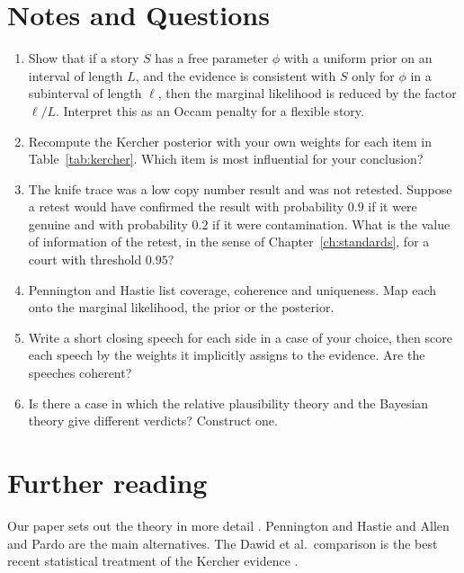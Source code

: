 \section*{Notes and Questions}
\begin{enumerate}[label=\arabic*.]
\item Show that if a story $S$ has a free parameter $\phi$ with a uniform prior on an interval of length $L$, and the evidence is consistent with $S$ only for $\phi$ in a subinterval of length $\ell$, then the marginal likelihood is reduced by the factor $\ell/L$. Interpret this as an Occam penalty for a flexible story.
\item Recompute the Kercher posterior with your own weights for each item in Table~\ref{tab:kercher}. Which item is most influential for your conclusion?
\item The knife trace was a low copy number result and was not retested. Suppose a retest would have confirmed the result with probability $0.9$ if it were genuine and with probability $0.2$ if it were contamination. What is the value of information of the retest, in the sense of Chapter~\ref{ch:standards}, for a court with threshold $0.95$?
\item Pennington and Hastie list coverage, coherence and uniqueness. Map each onto the marginal likelihood, the prior or the posterior.
\item Write a short closing speech for each side in a case of your choice, then score each speech by the weights it implicitly assigns to the evidence. Are the speeches coherent?
\item Is there a case in which the relative plausibility theory and the Bayesian theory give different verdicts? Construct one.
\end{enumerate}

\section*{Further reading}
Our paper sets out the theory in more detail \citep{polson_maharaj_stories}. Pennington and Hastie \citep{pennington1991} and Allen and Pardo \citep{allen2019} are the main alternatives. The Dawid et al.\ comparison is the best recent statistical treatment of the Kercher evidence \citep{dawid2024kercher}.
